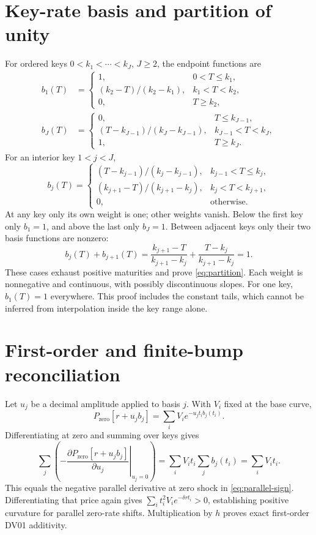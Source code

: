 \section{Key-rate basis and partition of unity}\label{sec:app-partition}
For ordered keys \(0<k_1<\cdots<k_J\), \(J\geq2\), the endpoint functions are
\begin{align}
b_1(T)&=\begin{cases}
1,&0<T\leq k_1,\\
(k_2-T)/(k_2-k_1),&k_1<T<k_2,\\
0,&T\geq k_2,
\end{cases}\label{eq:first-basis}\\
b_J(T)&=\begin{cases}
0,&T\leq k_{J-1},\\
(T-k_{J-1})/(k_J-k_{J-1}),&k_{J-1}<T<k_J,\\
1,&T\geq k_J.
\end{cases}\label{eq:last-basis}
\end{align}
For an interior key \(1<j<J\),
\begin{equation}\label{eq:interior-basis}
b_j(T)=\begin{cases}
(T-k_{j-1})/(k_j-k_{j-1}),&k_{j-1}<T\leq k_j,\\
(k_{j+1}-T)/(k_{j+1}-k_j),&k_j<T<k_{j+1},\\
0,&\text{otherwise}.
\end{cases}
\end{equation}
At any key only its own weight is one; other weights vanish. Below the first key only \(b_1=1\), and above the last only \(b_J=1\). Between adjacent keys only their two basis functions are nonzero:
\begin{equation}\label{eq:app-partition}
b_j(T)+b_{j+1}(T)
=\frac{k_{j+1}-T}{k_{j+1}-k_j}
+\frac{T-k_j}{k_{j+1}-k_j}=1.
\end{equation}
These cases exhaust positive maturities and prove \cref{eq:partition}. Each weight is nonnegative and continuous, with possibly discontinuous slopes. For one key, \(b_1(T)=1\) everywhere. This proof includes the constant tails, which cannot be inferred from interpolation inside the key range alone.

\section{First-order and finite-bump reconciliation}\label{sec:app-reconciliation}
Let \(u_j\) be a decimal amplitude applied to basis \(j\). With \(V_i\) fixed at the base curve,
\[
P_{\mathrm{zero}}[r+u_jb_j]=\sum_i V_i e^{-u_jt_i b_j(t_i)}.
\]
Differentiating at zero and summing over keys gives
\begin{equation}\label{eq:app-linear-risk}
\sum_j\left(-\left.\frac{\partial P_{\mathrm{zero}}[r+u_jb_j]}{\partial u_j}\right|_{u_j=0}\right)
=\sum_i V_it_i\sum_j b_j(t_i)
=\sum_iV_it_i.
\end{equation}
This equals the negative parallel derivative at zero shock in \cref{eq:parallel-sign}. Differentiating that price again gives \(\sum_i t_i^2V_i e^{-\delta r t_i}>0\), establishing positive curvature for parallel zero-rate shifts. Multiplication by \(h\) proves exact first-order DV01 additivity.

